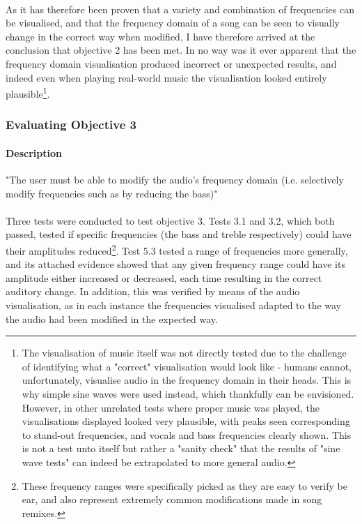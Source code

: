 \paragraph{}
As it has therefore been proven that a variety and combination of frequencies can be visualised, and that the frequency domain of a song can be seen to visually change in the correct way when modified, I have therefore arrived at the conclusion that objective 2 has been met. In no way was it ever apparent that the frequency domain visualisation produced incorrect or unexpected results, and indeed even when playing real-world music the visualisation looked entirely plausible\footnote{
	The visualisation of music itself was not directly tested due to the challenge of identifying what a "correct" visualisation would look like - humans cannot, unfortunately, visualise audio in the frequency domain in their heads. This is why simple sine waves were used instead, which thankfully can be envisioned. However, in other unrelated tests where proper music was played, the visualisations displayed looked very plausible, with peaks seen corresponding to stand-out frequencies, and vocals and bass frequencies clearly shown. This is not a test unto itself but rather a "sanity check" that the results of "sine wave tests" can indeed be extrapolated to more general audio.
}.

\pagebreak
\subsubsection{Evaluating Objective 3}
\paragraph{Description} "The user must be able to modify the audio’s frequency domain (i.e. selectively modify frequencies such
as by reducing the bass)"

\paragraph{}
Three tests were conducted to test objective 3. Tests 3.1 and 3.2, which both passed, tested if specific frequencies (the bass and treble respectively) could have their amplitudes reduced\footnote{
	These frequency ranges were specifically picked as they are easy to verify be ear, and also represent extremely common modifications made in song remixes.
}. Test 5.3 tested a range of frequencies more generally, and its attached evidence showed that any given frequency range could have its amplitude either increased or decreased, each time resulting in the correct auditory change. In addition, this was verified by means of the audio visualisation, as in each instance the frequencies visualised adapted to the way the audio had been modified in the expected way.

